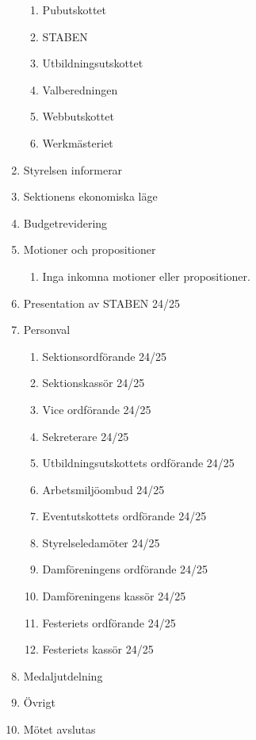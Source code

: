 \documentclass{datateknologsektionen-document}
\begin{document}
\begin{enumerate}[topsep=0pt,itemsep=1ex]
\begin{enumerate}[label*=\arabic*.,leftmargin=3em]
          \item Pubutskottet
          \item STABEN
          \item Utbildningsutskottet
          \item Valberedningen
          \item Webbutskottet
          \item Werkmästeriet
        \end{enumerate}
  \item Styrelsen informerar
  \item Sektionens ekonomiska läge
  \item Budgetrevidering
  \item Motioner och propositioner
        \begin{enumerate}[label*=\arabic*.,leftmargin=3em]
          \item Inga inkomna motioner eller propositioner.
        \end{enumerate}
  \item Presentation av STABEN 24/25
  \item Personval
        \begin{enumerate}[label*=\arabic*.,leftmargin=3em]
          \item Sektionsordförande 24/25
          \item Sektionskassör 24/25
          \item Vice ordförande 24/25
          \item Sekreterare 24/25
          \item Utbildningsutskottets ordförande 24/25
          \item Arbetsmiljöombud 24/25
          \item Eventutskottets ordförande 24/25
          \item Styrelseledamöter 24/25
          \item Damföreningens ordförande 24/25
          \item Damföreningens kassör 24/25
          \item Festeriets ordförande 24/25
          \item Festeriets kassör 24/25
        \end{enumerate}
  \item Medaljutdelning
  \item Övrigt
  \item Mötet avslutas
\end{enumerate}
\end{document}
